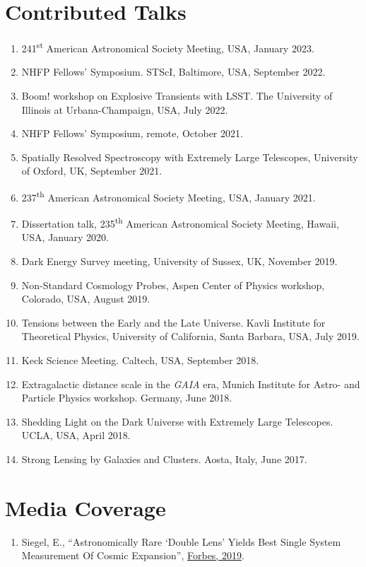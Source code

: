 \documentclass[margin, line]{res}
\begin{document}
\begin{resume}
\section{\sc Contributed Talks}
\begin{enumerate}
	\item 241\textsuperscript{st} American Astronomical Society Meeting, USA, January 2023.
	\item NHFP Fellows' Symposium. STScI, Baltimore, USA, September 2022.
	\item Boom! workshop on Explosive Transients with LSST. The University of Illinois at Urbana-Champaign, USA, July 2022.
	\item NHFP Fellows' Symposium, remote, October 2021.
	\item Spatially Resolved Spectroscopy with Extremely Large Telescopes, University of Oxford, UK, September 2021. %
	\item 237\textsuperscript{th} American Astronomical Society Meeting, USA, January 2021. %
	\item Dissertation talk, 235\textsuperscript{th} American Astronomical Society Meeting, Hawaii, USA, January 2020.
	\item Dark Energy Survey meeting, University of Sussex, UK, November 2019. %
	\item Non-Standard Cosmology Probes, Aspen Center of Physics workshop, Colorado, USA, August 2019.
	\item Tensions between the Early and the Late Universe. Kavli Institute for Theoretical Physics, University of California, Santa Barbara, USA, July 2019.
	\item Keck Science Meeting. Caltech, USA, September 2018.
	\item Extragalactic distance scale in the \textit{GAIA} era, Munich Institute for Astro- and Particle Physics workshop. Germany, June 2018.
	\item Shedding Light on the Dark Universe with Extremely Large Telescopes. UCLA, USA, April 2018.
	\item Strong Lensing by Galaxies and Clusters. Aosta, Italy, June 2017.
\end{enumerate}


\section{\sc Media Coverage}
\begin{enumerate}
	\item Siegel, E., ``Astronomically Rare `Double Lens' Yields Best Single System Measurement Of Cosmic Expansion'', \href{https://www.forbes.com/sites/startswithabang/2019/10/28/astronomically-rare-double-lens-yields-best-single-system-measurement-of-cosmic-expansion/#55acbc504373}{Forbes, 2019}.	
\end{enumerate}



\end{resume}
\end{document}
